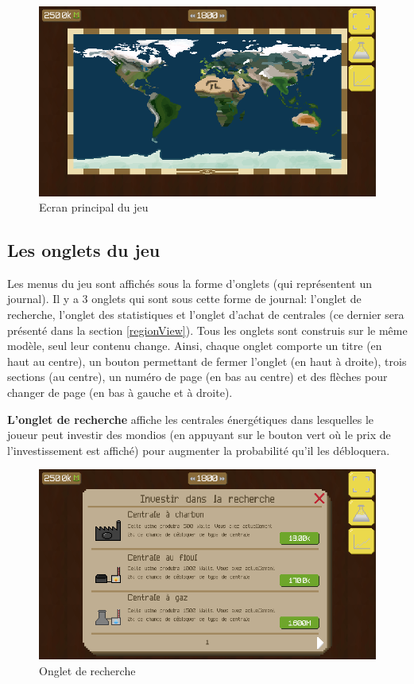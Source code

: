 \documentclass{article}
\begin{document}
		\begin{figure}[H]
                \includegraphics[width=\linewidth]{../images/worldView}
                \caption{Ecran principal du jeu}
                \label{fig:worldView}
        \end{figure} 
		
		\subsection{Les onglets du jeu} \label{onglets}
		Les menus du jeu sont affichés sous la forme d'onglets (qui représentent un journal).
		Il y a 3 onglets qui sont sous cette forme de journal: l'onglet de recherche, l'onglet des statistiques et l'onglet d'achat de centrales (ce dernier sera présenté dans la section \ref{regionView}).
		Tous les onglets sont construis sur le même modèle, seul leur contenu change. Ainsi, chaque onglet comporte un titre (en haut au centre), un bouton permettant de fermer l'onglet (en haut à droite), trois sections (au centre), un numéro de page (en bas au centre) et des flèches pour changer de page (en bas à gauche et à droite).
		
		
		\textbf{L'onglet de recherche} affiche les centrales énergétiques dans lesquelles le joueur peut investir des mondios (en appuyant sur le bouton vert où le prix de l'investissement est affiché) pour augmenter la probabilité qu'il les débloquera.
		
		\begin{figure}[H]
                \includegraphics[width=\linewidth]{../images/recherche}
                \caption{Onglet de recherche}
                \label{fig:research}
        \end{figure}
        
\end{document}
